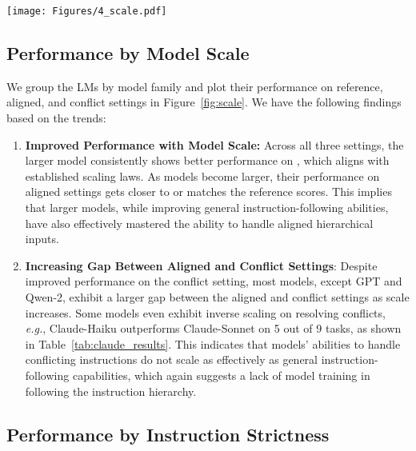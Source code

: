 \begin{figure*}[t]
    \centering
    \texttt{[image: Figures/4\_scale.pdf]}
    \vspace{-0.6cm}
    \caption{The trend of \benchmark\ performance by model scale.}
    \label{fig:scale}
\end{figure*}



\subsection{Performance by Model Scale}

We group the LMs by model family and plot their performance on reference, aligned, and conflict settings in Figure~\ref{fig:scale}. We have the following findings based on the trends:

\begin{enumerate}
    [noitemsep,topsep=3pt,parsep=1pt,partopsep=0pt,leftmargin=0.4cm]
    \item \textbf{Improved Performance with Model Scale:} Across all three settings, the larger model consistently shows better performance on \benchmark, which aligns with established scaling laws. As models become larger, their performance on aligned settings gets closer to or matches the reference scores. This implies that larger models, while improving general instruction-following abilities, have also effectively mastered the ability to handle aligned hierarchical inputs.
    \item \textbf{Increasing Gap Between Aligned and Conflict Settings}: Despite improved performance on the conflict setting, most models, except GPT and Qwen-2, exhibit a larger gap between the aligned and conflict settings as scale increases. Some models even exhibit inverse scaling on resolving conflicts, \textit{e.g.}, Claude-Haiku outperforms Claude-Sonnet on 5 out of 9 tasks, as shown in Table~\ref{tab:claude_results}. This indicates that models' abilities to handle conflicting instructions do not scale as effectively as general instruction-following capabilities, which again suggests a lack of model training in following the instruction hierarchy.
\end{enumerate}

\subsection{Performance by Instruction Strictness}

